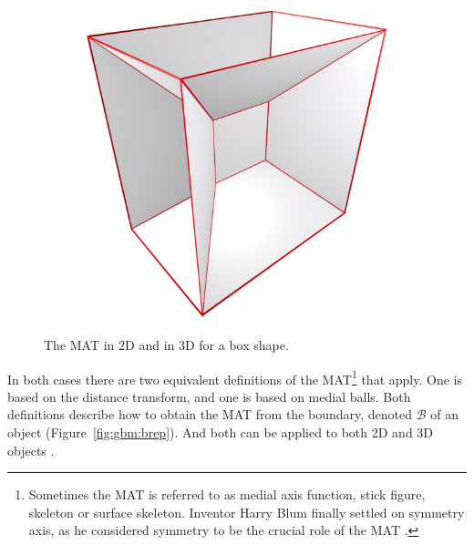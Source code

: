 \begin{figure}
\begin{subfigure}{0.33\linewidth}
		\label{fig:3dmat_halfopen}
	\end{subfigure}
	\quad
	\begin{subfigure}{0.33\linewidth}
		\includegraphics[width=\linewidth]{figs/Box2D3D/3dmat_sheets.png}
		\label{fig:3dmat_sheets}
	\end{subfigure}
	\caption{The MAT in 2D and in 3D for a box shape.}
	\label{fig:3dmat}
\end{figure}
In both cases there are two equivalent definitions of the MAT\footnote{Sometimes the MAT is referred to as medial axis function, stick figure, skeleton or surface skeleton.
	Inventor Harry Blum finally settled on symmetry axis, as he considered symmetry to be the crucial role of the MAT \citep{Blum73}.} that apply. 
One is based on the distance transform, and one is based on medial balls. 
Both definitions describe how to obtain the MAT from the boundary, denoted $
\mathcal{B}$ of an object (Figure~\ref{fig:gbm:brep}).
And both can be applied to both 2D and 3D objects .

